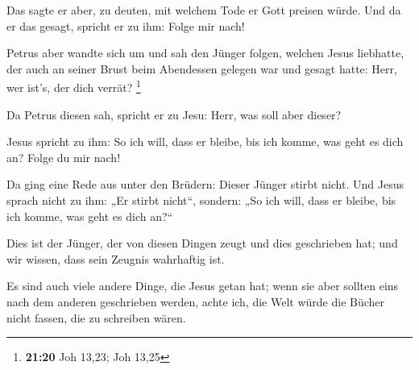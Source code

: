  Das sagte er aber, zu deuten, mit welchem Tode er Gott
preisen würde. Und da er das gesagt, spricht er zu ihm: Folge mir nach!

 Petrus aber wandte sich um und sah den Jünger folgen,
welchen Jesus liebhatte, der auch an seiner Brust beim Abendessen
gelegen war und gesagt hatte: Herr, wer ist's, der dich verrät?
\footnote{\textbf{21:20} Joh 13,23; Joh 13,25}

 Da Petrus diesen sah, spricht er zu Jesu: Herr, was soll
aber dieser?

 Jesus spricht zu ihm: So ich will, dass er bleibe, bis
ich komme, was geht es dich an? Folge du mir nach!

 Da ging eine Rede aus unter den Brüdern: Dieser Jünger
stirbt nicht. Und Jesus sprach nicht zu ihm: „Er stirbt nicht``,
sondern: „So ich will, dass er bleibe, bis ich komme, was geht es dich
an?{}``

 Dies ist der Jünger, der von diesen Dingen zeugt und
dies geschrieben hat; und wir wissen, dass sein Zeugnis wahrhaftig ist.

 Es sind auch viele andere Dinge, die Jesus getan hat;
wenn sie aber sollten eins nach dem anderen geschrieben werden, achte
ich, die Welt würde die Bücher nicht fassen, die zu schreiben wären.
